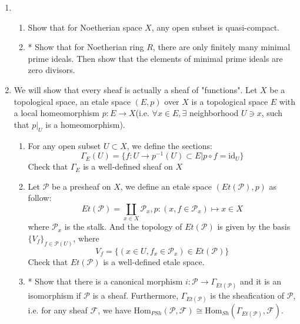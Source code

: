 \documentclass[a4paper,11pt]{article}
\def\mrm#1{\mathrm{#1}}
\def\Hom{\mathrm{Hom}}
\begin{document}
\begin{enumerate}[1.]
\item \begin{enumerate}
    \item Show that for Noetherian space $X$, any open subset is quasi-compact.
    \item* Show that for Noetherian ring $R$, there are only finitely many minimal prime ideals. Then show that the elements of minimal prime ideals are zero divisors.
\end{enumerate}
\item We will show that every sheaf is actually a sheaf of "functions". Let $X$ be a topological space, an etale space $(E,p)$ over $X$ is a topological space $E$ with a local homeomorphism $p:E\to X$(i.e. $\forall x\in E, \exists$ neighborhood $U\ni x$, such that $p|_U$ is a homeomorphism).
\begin{enumerate}
    \item For any open subset $U \subset X$, we define the sections:
    \[ \Gamma_E(U) = \{f:U\to p^{-1}(U)\subset E| p\circ f=\mrm{id}_U\}
        \]
    Check that $\Gamma_E$ is a well-defined sheaf on $X$
    \item Let $\mathcal{P}$ be a presheaf on $X$, we define an etale space $(Et(\mathcal{P}),p)$ as follow:
    \[Et(\mathcal{P})=\coprod _{x\in X} \mathcal{P}_x , p:(x, f\in \mathcal{P}_x) \mapsto x\in X\]
    where $\mathcal{P}_x$ is the stalk. And the topology of $Et(\mathcal{P}) $ is given by the basis $\{V_f\}_{f\in \mathcal{P}(U) }$, where 
    \[ V_f=\{(x\in U, f_x \in \mathcal{P}_x)\in Et(\mathcal{P})\}\]
    Check that $Et(\mathcal{P})$ is a well-defined etale space.
    \item* Show that there is a canonical morphism $i:\mathcal{P}\to \Gamma_{Et(\mathcal{P})}$ and it is an isomorphism if $\mathcal{P}$ is a sheaf. Furthermore, $\Gamma_{Et(\mathcal{P})}$ is the sheafication of $\mathcal{P}$, i.e. for any sheaf $\mathcal{F}$, we have $\Hom_{PSh}(\mathcal{P},\mathcal{F})\cong \Hom_{Sh}(\Gamma_{Et(\mathcal{P})},\mathcal{F})$.
\end{enumerate}




\end{enumerate}
\end{document}
